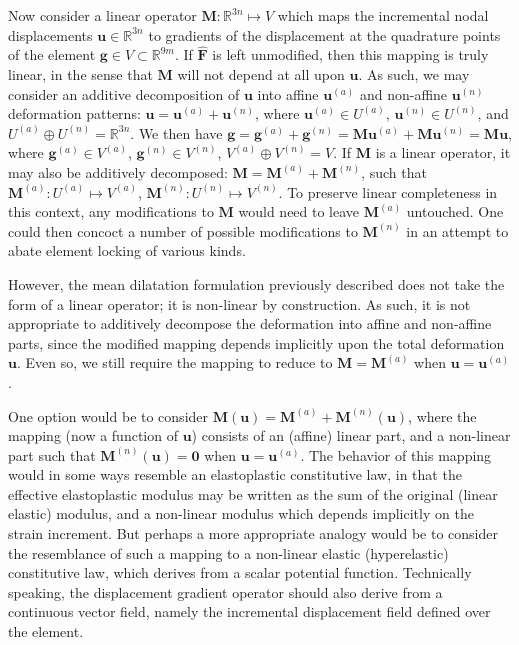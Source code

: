 \documentclass[11pt]{article} %
\begin{document}
Now consider a linear operator $\mathbf{M} : \mathbb{R}^{3n} \mapsto V$ which maps the incremental nodal displacements $\mathbf{u} \in \mathbb{R}^{3n}$ to gradients of the displacement at the quadrature points of the element $\mathbf{g} \in V \subset \mathbb{R}^{9m}$. If $\hat{\mathbf{F}}$ is left unmodified, then this mapping is truly linear, in the sense that $\mathbf{M}$ will not depend at all upon $\mathbf{u}$. As such, we may consider an additive decomposition of $\mathbf{u}$ into affine $\mathbf{u}^{(a)}$ and non-affine $\mathbf{u}^{(n)}$ deformation patterns: $\mathbf{u} = \mathbf{u}^{(a)} + \mathbf{u}^{(n)}$, where $\mathbf{u}^{(a)} \in U^{(a)}$, $\mathbf{u}^{(n)} \in U^{(n)}$, and $U^{(a)} \oplus U^{(n)} = \mathbb{R}^{3n}$. We then have $\mathbf{g} = \mathbf{g}^{(a)} + \mathbf{g}^{(n)} = \mathbf{M} \mathbf{u}^{(a)} + \mathbf{M} \mathbf{u}^{(n)} = \mathbf{M} \mathbf{u}$, where $\mathbf{g}^{(a)} \in V^{(a)}$, $\mathbf{g}^{(n)} \in V^{(n)}$, $V^{(a)} \oplus V^{(n)} = V$. If $\mathbf{M}$ is a linear operator, it may also be additively decomposed: $\mathbf{M} = \mathbf{M}^{(a)} + \mathbf{M}^{(n)}$, such that $\mathbf{M}^{(a)} : U^{(a)} \mapsto V^{(a)}$, $\mathbf{M}^{(n)} : U^{(n)} \mapsto V^{(n)}$. To preserve linear completeness in this context, any modifications to $\mathbf{M}$ would need to leave $\mathbf{M}^{(a)}$ untouched. One could then concoct a number of possible modifications to $\mathbf{M}^{(n)}$ in an attempt to abate element locking of various kinds.

However, the mean dilatation formulation previously described does not take the form of a linear operator; it is non-linear by construction. As such, it is not appropriate to additively decompose the deformation into affine and non-affine parts, since the modified mapping depends implicitly upon the total deformation $\mathbf{u}$. Even so, we still require the mapping to reduce to $\mathbf{M} = \mathbf{M}^{(a)}$ when $\mathbf{u} = \mathbf{u}^{(a)}$.

One option would be to consider $\mathbf{M} (\mathbf{u}) = \mathbf{M}^{(a)} + \mathbf{M}^{(n)} (\mathbf{u})$, where the mapping (now a function of $\mathbf{u}$) consists of an (affine) linear part, and a non-linear part such that $\mathbf{M}^{(n)} (\mathbf{u}) = \mathbf{0}$ when $\mathbf{u} = \mathbf{u}^{(a)}$. The behavior of this mapping would in some ways resemble an elastoplastic constitutive law, in that the effective elastoplastic modulus may be written as the sum of the original (linear elastic) modulus, and a non-linear modulus which depends implicitly on the strain increment. But perhaps a more appropriate analogy would be to consider the resemblance of such a mapping to a non-linear elastic (hyperelastic) constitutive law, which derives from a scalar potential function. Technically speaking, the displacement gradient operator should also derive from a continuous vector field, namely the incremental displacement field defined over the element.
\end{document}
